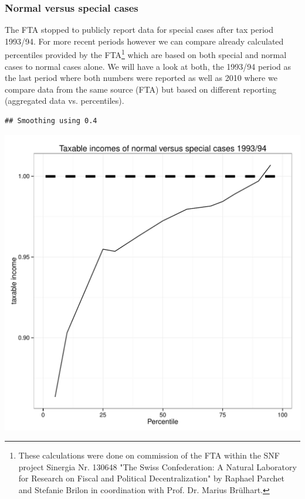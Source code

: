\documentclass[twoside]{article}\usepackage[]{graphicx}\usepackage[]{color}
\makeatletter
\def\maxwidth{ %
  \ifdim\Gin@nat@width>\linewidth
    \linewidth
  \else
    \Gin@nat@width
  \fi
}
\newenvironment{kframe}{%
 \def\at@end@of@kframe{}%
 \ifinner\ifhmode%
  \def\at@end@of@kframe{\end{minipage}}%
  \begin{minipage}{\columnwidth}%
 \fi\fi%
 \def\FrameCommand##1{\hskip\@totalleftmargin \hskip-\fboxsep
 \colorbox{shadecolor}{##1}\hskip-\fboxsep
     \hskip-\linewidth \hskip-\@totalleftmargin \hskip\columnwidth}%
 \MakeFramed {\advance\hsize-\width
   \@totalleftmargin\z@ \linewidth\hsize
   \@setminipage}}%
 {\par\unskip\endMakeFramed%
 \at@end@of@kframe}
\newenvironment{knitrout}{}{} %
\makeatother
\begin{document}
\begin{multicols}{2}
\subsubsection{Normal versus special cases}

The FTA stopped to publicly report data for special cases after tax period 1993/94. 
For more recent periods however we can compare already calculated percentiles provided by the FTA\footnote{These calculations were done on commission of the FTA within the SNF project Sinergia Nr. 130648 "The Swiss Confederation: A Natural Laboratory for Research on Fiscal and Political Decentralization" by Raphael Parchet and Stefanie Brilon in coordination with Prof. Dr. Marius Brülhart.} which are based on both special and normal cases to normal cases alone.
We will have a look at both, the 1993/94 period as the last period where both 
numbers were reported as well as 2010 where we compare data from the same source (FTA)
but based on different reporting (aggregated data vs. percentiles).



\begin{knitrout}
\color{fgcolor}\begin{kframe}
\begin{verbatim}
## Smoothing using 0.4
\end{verbatim}
\end{kframe}
\includegraphics[width=\maxwidth]{figure/specialcases9394} 


\end{knitrout}
\end{multicols}
\end{document}

